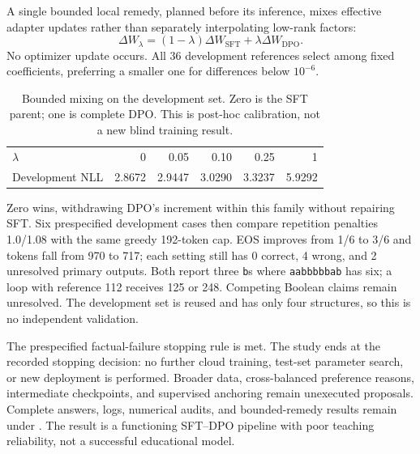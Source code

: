 A single bounded local remedy, planned before its inference, mixes effective adapter updates rather than separately interpolating low-rank factors:
\begin{equation}
\Delta W_\lambda=(1-\lambda)\Delta W_{\mathrm{SFT}}+\lambda\Delta W_{\mathrm{DPO}}.
\end{equation}
No optimizer update occurs. All 36 development references select among fixed coefficients, preferring a smaller one for differences below $10^{-6}$.

\begin{table}[H]\centering\small
\caption{Bounded mixing on the development set. Zero is the SFT parent; one is complete DPO. This is post-hoc calibration, not a new blind training result.}\label{tab:training-remedy}
\begin{tabular}{@{}lrrrrr@{}}\toprule
$\lambda$ & 0 & 0.05 & 0.10 & 0.25 & 1\\
Development NLL & 2.8672 & 2.9447 & 3.0290 & 3.3237 & 5.9292\\\bottomrule
\end{tabular}
\end{table}\FloatBarrier

Zero wins, withdrawing DPO's increment within this family without repairing SFT. Six prespecified development cases then compare repetition penalties 1.0/1.08 with the same greedy 192-token cap. EOS improves from 1/6 to 3/6 and tokens fall from 970 to 717; each setting still has 0 correct, 4 wrong, and 2 unresolved primary outputs. Both report three \texttt{b}s where \texttt{aabbbbbab} has six; a loop with reference 112 receives 125 or 248. Competing Boolean claims remain unresolved. The development set is reused and has only four structures, so this is no independent validation.

The prespecified factual-failure stopping rule is met. The study ends at the recorded stopping decision: no further cloud training, test-set parameter search, or new deployment is performed. Broader data, cross-balanced preference reasons, intermediate checkpoints, and supervised anchoring remain unexecuted proposals. Complete answers, logs, numerical audits, and bounded-remedy results remain under . The result is a functioning SFT--DPO pipeline with poor teaching reliability, not a successful educational model.
